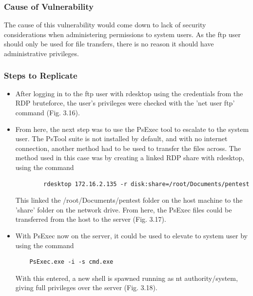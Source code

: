 \documentclass{report}
\begin{document}
\subsubsection{Cause of Vulnerability}
The cause of this vulnerability would come down to lack of security considerations when administering permissions to system users. As the ftp user should only be used for file transfers, there is no reason it should have administrative privileges.
\subsubsection{Steps to Replicate}
\begin{itemize}
	\item After logging in to the ftp user with rdesktop using the credentials from the RDP bruteforce, the user's privileges were checked with the 'net user ftp' command (Fig. 3.16).
	\item From here, the next step was to use the PsExec tool to escalate to the system user. The PsTool suite is not installed by default, and with no internet connection, another method had to be used to transfer the files across. The method used in this case was by creating a linked RDP share with rdesktop, using the command
	\begin{verbatim}
		rdesktop 172.16.2.135 -r disk:share=/root/Documents/pentest
	\end{verbatim}
This linked the /root/Documents/pentest folder on the host machine to the 'share' folder on the network drive. From here, the PsExec files could be transferred from the host to the server (Fig. 3.17).
	\item With PsExec now on the server, it could be used to elevate to system user by using the command
	\begin{verbatim}
	PsExec.exe -i -s cmd.exe
	\end{verbatim}
	With this entered, a new shell is spawned running as nt authority/system, giving full privileges over the server (Fig. 3.18).
\end{itemize}
\end{document}
